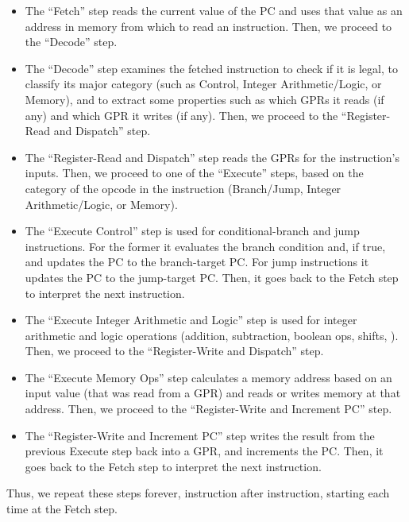 \begin{itemize}

\item The ``Fetch'' step reads the current value of the PC and uses
  that value as an address in memory from which to read an
  instruction.  Then, we proceed to the ``Decode'' step.

\item The ``Decode'' step examines the fetched instruction to check if
  it is legal, to classify its major category (such as Control,
  Integer Arithmetic/Logic, or Memory), and to extract some properties
  such as which GPRs it reads (if any) and which GPR it writes (if
  any).  Then, we proceed to the ``Register-Read and Dispatch'' step.

\item The ``Register-Read and Dispatch'' step reads the GPRs for the
instruction's inputs.  Then, we proceed to one of the ``Execute''
steps, based on the category of the opcode in the instruction
(Branch/Jump, Integer Arithmetic/Logic, or Memory).

\item The ``Execute Control'' step is used for conditional-branch and
jump instructions.  For the former it evaluates the branch condition
and, if true, and updates the PC to the branch-target PC.  For jump
instructions it updates the PC to the jump-target PC. Then, it goes
back to the Fetch step to interpret the next instruction.

\item The ``Execute Integer Arithmetic and Logic'' step is used for
integer arithmetic and logic operations (addition, subtraction,
boolean ops, shifts, {\etc}).  Then, we proceed to the
``Register-Write and Dispatch'' step.

\item The ``Execute Memory Ops'' step calculates a memory address
based on an input value (that was read from a GPR) and reads or writes
memory at that address.  Then, we proceed to the ``Register-Write and
Increment PC'' step.

\item The ``Register-Write and Increment PC'' step writes the result
from the previous Execute step back into a GPR, and increments the PC.
Then, it goes back to the Fetch step to interpret the next
instruction.

\end{itemize}

Thus, we repeat these steps forever, instruction after instruction,
starting each time at the Fetch step.

